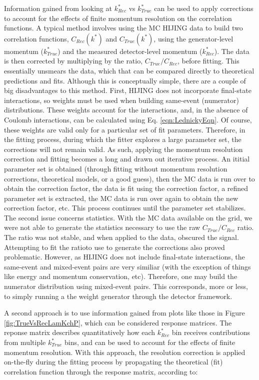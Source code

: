 \documentclass[ALICE,manyauthors]{cernphprep}
\begin{document}
Information gained from looking at $k^{*}_{Rec}$ vs $k^{*}_{True}$ can be used to apply corrections to account for the effects of finite momentum resolution on the correlation functions.
A typical method involves using the MC HIJING data to build two correlation functions, $C_{Rec}(k^{*})$ and $C_{True}(k^{*})$, using the generator-level momentum ($k^{*}_{True}$) and the measured detector-level momentum ($k^{*}_{Rec}$).
The data is then corrected by multiplying by the ratio, $C_{True}/C_{Rec}$, before fitting.
This essentially unsmears the data, which that can be compared directly to theoretical predictions and fits.
Although this is conceptually simple, there are a couple of big disadvantages to this method.
First, HIJING does not incorporate final-state interactions, so weights must be used when building same-event (numerator) distributions.
These weights account for the interactions, and, in the absence of Coulomb interactions, can be calculated using Eq. \ref{eqn:LednickyEqn}.
Of course, these weights are valid only for a particular set of fit parameters.
Therefore, in the fitting process, during which the fitter explores a large parameter set, the corrections will not remain valid.
As such, applying the momentum resolution correction and fitting becomes a long and drawn out iterative process.
An ititial parameter set is obtained (through fitting without momentum resolution corrections, theoretical models, or a good guess), then the MC data is run over to obtain the correction factor, the data is fit using the correction factor, a refined parameter set is extracted, the MC data is run over again to obtain the new correction factor, etc.
This process continues until the parameter set stabilizes.
The second issue concerns statistics.
With the MC data available on the grid, we were not able to generate the statistics necessary to use the raw $C_{True}/C_{Rec}$ ratio.
The ratio was not stable, and when applied to the data, obscured the signal.
Attempting to fit the ratioto use to generate the corrections also proved problematic.
However, as HIJING does not include final-state interactions, the same-event and mixed-event pairs are very similiar (with the exception of things like energy and momentum conservation, etc).
Therefore, one may build the numerator distribution using mixed-event pairs.
This corresponds, more or less, to simply running a the weight generator through the detector framework.

A second approach is to use information gained from plots like those in Figure \ref{fig:TrueVsRecLamKchP}, which can be considered response matrices.
The reponse matrix describes quantitatively how each $k^{*}_{Rec}$ bin receives contributions from multiple $k^{*}_{True}$ bins, and can be used to account for the effects of finite momentum resolution.
With this approach, the resolution correction is applied on-the-fly during the fitting process by propagating the theoretical (fit) correlation function through the response matrix, according to:  
\end{document}
